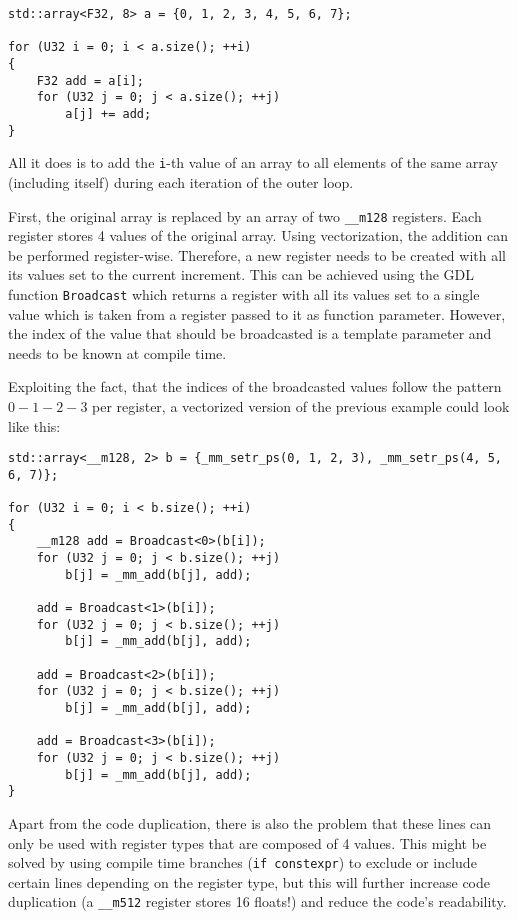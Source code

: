 \documentclass[fontsize = 10pt,DIV = 13]{scrartcl}
\begin{document}
\begin{verbatim}
std::array<F32, 8> a = {0, 1, 2, 3, 4, 5, 6, 7};

for (U32 i = 0; i < a.size(); ++i)
{
    F32 add = a[i];
    for (U32 j = 0; j < a.size(); ++j)
        a[j] += add;
}
\end{verbatim}

All it does is to add the \texttt{i}-th value of an array to all elements of the same array (including itself) during each iteration of the outer loop.

First, the original array is replaced by an array of two \texttt{__m128} registers.
Each register stores 4 values of the original array.
Using vectorization, the addition can be performed register-wise.
Therefore, a new register needs to be created with all its values set to the current increment.
This can be achieved using the GDL function \texttt{Broadcast} which returns a register with all its values set to a single value which is taken from a register passed to it as function parameter.
However, the index of the value that should be broadcasted is a template parameter and needs to be known at compile time.

Exploiting the fact, that the indices of the broadcasted values follow the pattern $0-1-2-3$ per register, a vectorized version of the previous example could look like this: 


\begin{verbatim}
std::array<__m128, 2> b = {_mm_setr_ps(0, 1, 2, 3), _mm_setr_ps(4, 5, 6, 7)};
    
for (U32 i = 0; i < b.size(); ++i)
{
    __m128 add = Broadcast<0>(b[i]);
    for (U32 j = 0; j < b.size(); ++j)
        b[j] = _mm_add(b[j], add);

    add = Broadcast<1>(b[i]);
    for (U32 j = 0; j < b.size(); ++j)
        b[j] = _mm_add(b[j], add);

    add = Broadcast<2>(b[i]);
    for (U32 j = 0; j < b.size(); ++j)
        b[j] = _mm_add(b[j], add);

    add = Broadcast<3>(b[i]);
    for (U32 j = 0; j < b.size(); ++j)
        b[j] = _mm_add(b[j], add);
}
\end{verbatim}

Apart from the code duplication, there is also the problem that these lines can only be used with register types that are composed of 4 values.
This might be solved by using compile time branches (\texttt{if constexpr}) to exclude or include certain lines depending on the register type, but this will further increase code duplication (a \texttt{__m512} register stores 16 floats!) and reduce the code's readability.
\end{document}
